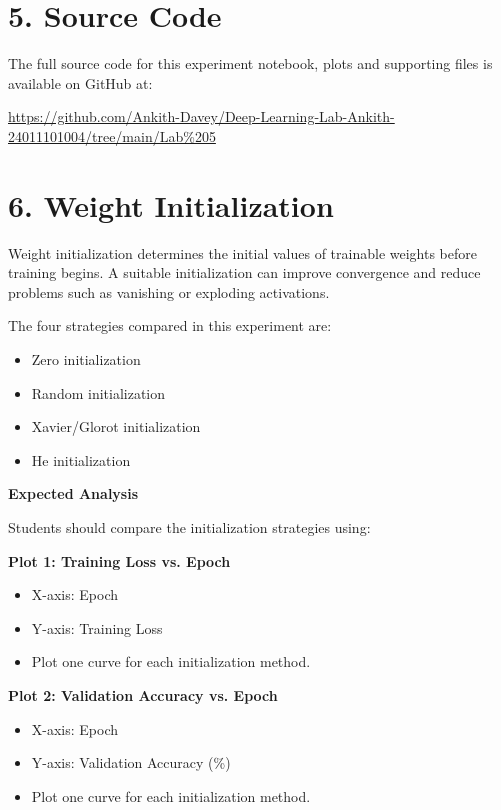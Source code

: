 \documentclass[10pt]{article}
\begin{document}
\section*{5. Source Code}

The full source code for this experiment notebook, plots and supporting
files is available on GitHub at:

\begin{center}
\url{https://github.com/Ankith-Davey/Deep-Learning-Lab-Ankith-24011101004/tree/main/Lab%205}
\end{center}

\section*{6. Weight Initialization}

Weight initialization determines the initial values of trainable weights
before training begins. A suitable initialization can improve convergence and
reduce problems such as vanishing or exploding activations.

The four strategies compared in this experiment are:

\begin{itemize}
\item Zero initialization
\item Random initialization
\item Xavier/Glorot initialization
\item He initialization
\end{itemize}

\textbf{Expected Analysis}

Students should compare the initialization strategies using:

\textbf{Plot 1: Training Loss vs. Epoch}
\begin{itemize}
\item X-axis: Epoch
\item Y-axis: Training Loss
\item Plot one curve for each initialization method.
\end{itemize}

\textbf{Plot 2: Validation Accuracy vs. Epoch}
\begin{itemize}
\item X-axis: Epoch
\item Y-axis: Validation Accuracy (\%)
\item Plot one curve for each initialization method.
\end{itemize}
\end{document}
